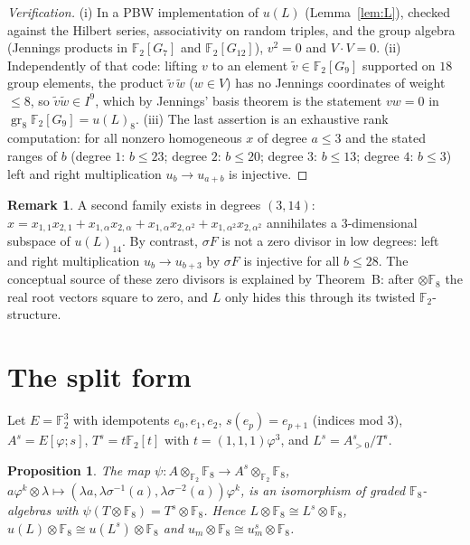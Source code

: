 \documentclass[11pt]{amsart}
\newtheorem{proposition}[theorem]{Proposition}
\theoremstyle{definition}
\newtheorem{remark}[theorem]{Remark}
\newcommand{\F}{\mathbb{F}}
\newcommand{\gr}{\operatorname{gr}}
\begin{document}
\begin{proof}[Verification]
(i) In a PBW implementation of $u(L)$ (Lemma~\ref{lem:L}), checked against the Hilbert series, associativity on
random triples, and the group algebra (Jennings products in $\F_2[G_7]$ and $\F_2[G_{12}]$), $v^2=0$ and
$V\cdot V=0$. (ii) Independently of that code: lifting $v$ to an element $\tilde v\in\F_2[G_9]$ supported on
$18$ group elements, the product $\tilde v\,\tilde w$ ($w\in V$) has no Jennings coordinates of weight $\le 8$,
so $\tilde v\tilde w\in I^9$, which by Jennings' basis theorem is the statement $vw=0$ in
$\gr_8\F_2[G_9]=u(L)_8$. (iii) The last assertion is an exhaustive rank computation: for all nonzero homogeneous
$x$ of degree $a\le3$ and the stated ranges of $b$ (degree $1$: $b\le23$; degree $2$: $b\le20$; degree $3$:
$b\le13$; degree $4$: $b\le3$) left and right multiplication $u_b\to u_{a+b}$ is injective.
\end{proof}

\begin{remark}
A second family exists in degrees $(3,14)$: $x=x_{1,1}x_{2,1}+x_{1,\alpha}x_{2,\alpha}+x_{1,\alpha}x_{2,\alpha^2}+x_{1,\alpha^2}x_{2,\alpha^2}$
annihilates a $3$-dimensional subspace of $u(L)_{14}$. By contrast, $\sigma F$ is not a zero divisor in low degrees:
left and right multiplication $u_b\to u_{b+3}$ by $\sigma F$ is injective for all $b\le28$.
The conceptual source of these zero divisors is explained by Theorem~B: after $\otimes\F_8$ the real root vectors
square to zero, and $L$ only hides this through its twisted $\F_2$-structure.
\end{remark}

\section{The split form}\label{sec:split}

Let $E=\F_2^3$ with idempotents $e_0,e_1,e_2$, $s(e_p)=e_{p+1}$ (indices mod $3$), $A^s=E[\varphi;s]$,
$T^s=t\F_2[t]$ with $t=(1,1,1)\varphi^3$, and $L^s=A^s_{>0}/T^s$.

\begin{proposition}\label{prop:split}
The map $\psi:A\otimes_{\F_2}\F_8\to A^s\otimes_{\F_2}\F_8$, $a\varphi^k\otimes\lambda\mapsto(\lambda a,\lambda\sigma^{-1}(a),\lambda\sigma^{-2}(a))\varphi^k$,
is an isomorphism of graded $\F_8$-algebras with $\psi(T\otimes\F_8)=T^s\otimes\F_8$. Hence
$L\otimes\F_8\cong L^s\otimes\F_8$, $u(L)\otimes\F_8\cong u(L^s)\otimes\F_8$ and $u_m\otimes\F_8\cong u^s_m\otimes\F_8$.
\end{proposition}
\end{document}
